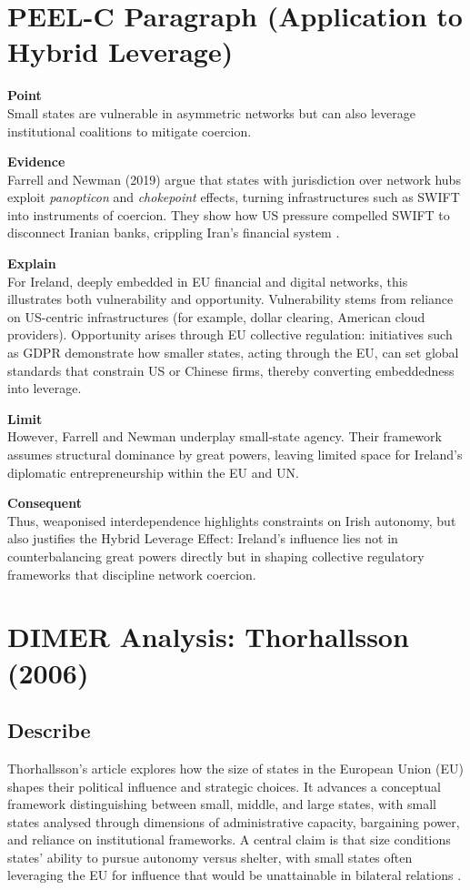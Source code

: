 \section*{PEEL-C Paragraph (Application to Hybrid Leverage)}

\textbf{Point} \\
Small states are vulnerable in asymmetric networks but can also leverage institutional coalitions to mitigate coercion.  

\textbf{Evidence} \\
Farrell and Newman (2019) argue that states with jurisdiction over network hubs exploit \textit{panopticon} and \textit{chokepoint} effects, turning infrastructures such as SWIFT into instruments of coercion. They show how US pressure compelled SWIFT to disconnect Iranian banks, crippling Iran’s financial system \parencite{FARRELL_2019}.  

\textbf{Explain} \\
For Ireland, deeply embedded in EU financial and digital networks, this illustrates both vulnerability and opportunity. Vulnerability stems from reliance on US-centric infrastructures (for example, dollar clearing, American cloud providers). Opportunity arises through EU collective regulation: initiatives such as GDPR demonstrate how smaller states, acting through the EU, can set global standards that constrain US or Chinese firms, thereby converting embeddedness into leverage.  

\textbf{Limit} \\
However, Farrell and Newman underplay small-state agency. Their framework assumes structural dominance by great powers, leaving limited space for Ireland’s diplomatic entrepreneurship within the EU and UN.  

\textbf{Consequent} \\
Thus, weaponised interdependence highlights constraints on Irish autonomy, but also justifies the Hybrid Leverage Effect: Ireland’s influence lies not in counterbalancing great powers directly but in shaping collective regulatory frameworks that discipline network coercion.  

\section*{DIMER Analysis: Thorhallsson (2006)}

\subsection*{Describe}
Thorhallsson’s article explores how the size of states in the European Union (EU) shapes their political influence and strategic choices. It advances a conceptual framework distinguishing between small, middle, and large states, with small states analysed through dimensions of administrative capacity, bargaining power, and reliance on institutional frameworks. A central claim is that size conditions states’ ability to pursue autonomy versus shelter, with small states often leveraging the EU for influence that would be unattainable in bilateral relations \parencite{THORHALLSSON_2006}.

